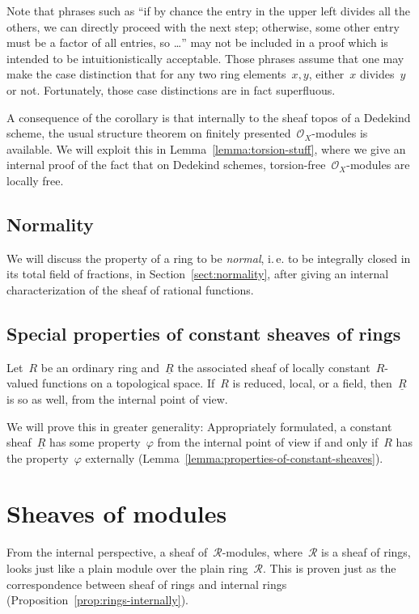 \documentclass[10pt]{amsart}
\makeatletter
\theoremstyle{definition}
\theoremstyle{plain}
\theoremstyle{remark}
\renewcommand{\O}{\mathcal{O}}
\newcommand{\R}{\mathcal{R}}
\newcommand{\ul}[1]{\underline{#1}}
\newcommand{\?}{\,{:}\,}
\renewcommand{\_}{\mathpunct{.}\,}
\newcommand{\ie}{i.\,e.\@\xspace}
\makeatother
\begin{document}
Note that phrases such as ``if by chance the entry in the upper left divides
all the others, we can directly proceed with the next step; otherwise, some
other entry must be a factor of all entries, so \ldots'' may not be included in
a proof which is intended to be intuitionistically acceptable.
Those phrases assume that one may make the case distinction that for
any two ring elements~$x,y$, either~$x$ divides~$y$ or not. Fortunately, those
case distinctions are in fact superfluous.

A consequence of the corollary is that internally to the sheaf topos of a
Dedekind scheme, the usual structure theorem on finitely
presented~$\O_X$-modules is available. We will exploit this in
Lemma~\ref{lemma:torsion-stuff}, where we give an internal proof of the
fact that on Dedekind schemes, torsion-free~$\O_X$-modules are locally free.


\subsection{Normality} We will discuss the property of a ring to be
\emph{normal}, \ie to be integrally closed in its total field of
fractions, in Section~\ref{sect:normality}, after giving an internal
characterization of the sheaf of rational functions.


\subsection{Special properties of constant sheaves of rings} Let~$R$ be an
ordinary ring and~$\ul{R}$ the associated sheaf of locally constant~$R$-valued
functions on a topological space. If~$R$ is reduced, local, or a field,
then~$\ul{R}$ is so as well, from the internal point of view.

We will prove this in greater generality: Appropriately formulated, a constant
sheaf~$\ul{R}$ has some property~$\varphi$ from the internal point of view if
and only if~$R$ has the property~$\varphi$ externally
(Lemma~\ref{lemma:properties-of-constant-sheaves}).


\section{Sheaves of modules}

From the internal perspective, a sheaf of~$\R$-modules, where~$\R$ is a sheaf
of rings, looks just like a plain module over the plain ring~$\R$. This is
proven just as the correspondence between sheaf of rings and internal rings
(Proposition~\ref{prop:rings-internally}).
\end{document}
